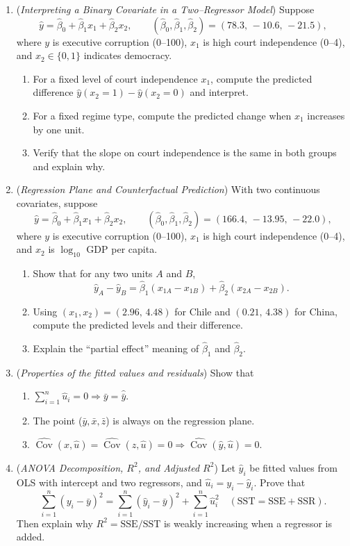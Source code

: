 \documentclass[12pt]{article}
\newcommand{\cov}{\operatorname{Cov}}
\begin{document}
\begin{enumerate}\itemsep3em

\item (\emph{Interpreting a Binary Covariate in a Two–Regressor Model})  
Suppose
\[
\widehat{y}=\hat\beta_0+\hat\beta_1 x_1+\hat\beta_2 x_2,\qquad
(\hat\beta_0,\hat\beta_1,\hat\beta_2)=(78.3,\,-10.6,\,-21.5),
\]
where $y$ is executive corruption (0--100), $x_1$ is high court independence (0--4), and $x_2\in\{0,1\}$ indicates democracy.
\begin{enumerate}\itemsep9em
    \item For a fixed level of court independence $x_1$, compute the predicted difference $\widehat{y}(x_2=1)-\widehat{y}(x_2=0)$ and interpret.  
    \item For a fixed regime type, compute the predicted change when $x_1$ increases by one unit.  
    \item Verify that the slope on court independence is the same in both groups and explain why.
\end{enumerate}

\clearpage
\item (\emph{Regression Plane and Counterfactual Prediction})  
With two continuous covariates, suppose
\[
\widehat{y}=\hat\beta_0+\hat\beta_1 x_1+\hat\beta_2 x_2,\qquad
(\hat\beta_0,\hat\beta_1,\hat\beta_2)=(166.4,\,-13.95,\,-22.0),
\]
where $y$ is executive corruption (0--100), $x_1$ is high court independence (0--4), and $x_2$ is $\log_{10}$ GDP per capita.
\begin{enumerate}\itemsep9em
    \item Show that for any two units $A$ and $B$,
\[
\widehat{y}_A-\widehat{y}_B=\hat\beta_1(x_{1A}-x_{1B})+\hat\beta_2(x_{2A}-x_{2B}).
\]
    \item Using $(x_1,x_2)=(2.96,\,4.48)$ for Chile and $(0.21,\,4.38)$ for China, compute the predicted levels and their difference.
    \item Explain the ``partial effect'' meaning of $\hat\beta_1$ and $\hat\beta_2$.
\end{enumerate}

\clearpage
\item (\emph{Properties of the fitted values and residuals}) Show that
\begin{enumerate}\itemsep9em
  \item $\sum_{i=1}^n \hat{u}_i=0 \Rightarrow \bar{y}=\hat{\bar{y}}$.
\item The point ($\bar{y}, \bar{x},\bar{z}$) is always on the regression plane.
\item $\widehat{\cov}(x,\hat{u})=\widehat{\cov}(z,\hat{u})=0 \Rightarrow \widehat{\cov}(\hat{y},\hat{u})=0$.
\end{enumerate}


\clearpage
\item (\emph{ANOVA Decomposition, $R^2$, and Adjusted $R^2$})  
Let $\hat y_i$ be fitted values from OLS with intercept and two regressors, and $\hat u_i=y_i-\hat y_i$. Prove that
\[
\sum_{i=1}^n(y_i-\bar y)^2=\sum_{i=1}^n(\hat y_i-\bar y)^2+\sum_{i=1}^n\hat u_i^2\quad(\text{SST}=\text{SSE}+\text{SSR}).
\]
Then explain why $R^2=\text{SSE}/\text{SST}$ is weakly increasing when a regressor is added.


\end{enumerate}
\end{document}
